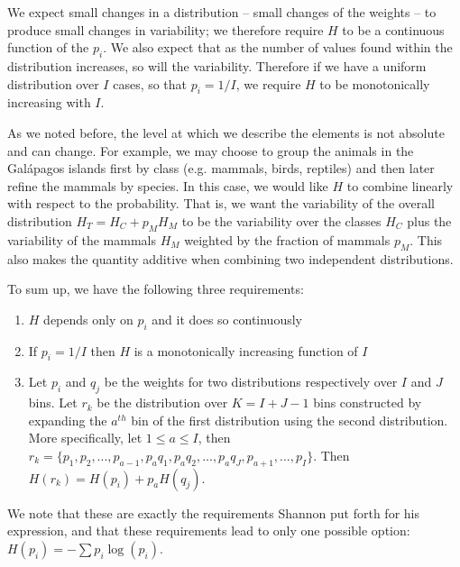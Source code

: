 \documentclass{article}
\begin{document}
We  expect small changes in a distribution -- small changes of the weights -- to produce small changes in variability; we therefore require $H$ to be a continuous function of the $p_i$. We also expect that as the number of values found within the distribution increases, so will the variability. Therefore if we have a uniform distribution over $I$ cases, so that $p_i = 1/I$, we require $H$ to be monotonically increasing with $I$.

As we noted before, the level at which we describe the elements is not absolute and can change. For example, we may choose to group the animals in the Gal\'{a}pagos islands first by class (e.g. mammals, birds, reptiles) and then later refine the mammals by species. In this case, we would like $H$ to combine linearly with respect to the probability. That is, we want the variability of the overall distribution $H_T = H_C + p_M H_M$ to be the variability over the classes $H_C$ plus the variability of the mammals $H_M$ weighted by the fraction of mammals $p_M$. This also makes the quantity additive when combining two independent distributions.

To sum up, we have the following three requirements:
\begin{enumerate}
\item $H$ depends only on $p_i$ and it does so continuously
\item If $p_i=1/I$ then $H$ is a monotonically increasing function of $I$
\item Let $p_i$ and $q_j$ be the weights for two distributions respectively over $I$ and $J$ bins. Let $r_k$ be the distribution over $K=I+J-1$ bins constructed by expanding the $a^{th}$ bin of the first distribution using the second distribution. More specifically, let $1 \leq a \leq I$, then $r_k = \{p_1, p_2, ..., p_{a-1}, p_{a}q_1, p_{a}q_2, ..., p_{a}q_J, p_{a+1}, ..., p_I \}$. Then $H(r_k) = H(p_i) + p_{a} H(q_j)$.
\end{enumerate}

We note that these are exactly the requirements Shannon put forth for his expression\cite{Shannon}, and that these requirements lead to only one possible option: $H(p_i) = - \sum p_i \log(p_i)$.
\end{document}
